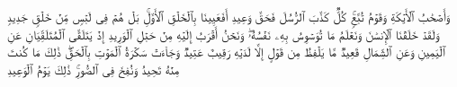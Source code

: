 \stopbuffer%
\startbuffer[\q:50:14]
وَأَصۡحَٰبُ ٱلۡأَیۡكَةِ وَقَوۡمُ تُبَّعࣲۚ كُلࣱّ كَذَّبَ ٱلرُّسُلَ فَحَقَّ وَعِیدِ%
\stopbuffer%
\startbuffer[\q:50:15]
أَفَعَیِینَا بِٱلۡخَلۡقِ ٱلۡأَوَّلِۚ بَلۡ هُمۡ فِی لَبۡسࣲ مِّنۡ خَلۡقࣲ جَدِیدࣲ%
\stopbuffer%
\startbuffer[\q:50:16]
وَلَقَدۡ خَلَقۡنَا ٱلۡإِنسَٰنَ وَنَعۡلَمُ مَا تُوَسۡوِسُ بِهِۦ نَفۡسُهُۥۖ وَنَحۡنُ أَقۡرَبُ إِلَیۡهِ مِنۡ حَبۡلِ ٱلۡوَرِیدِ%
\stopbuffer%
\startbuffer[\q:50:17]
إِذۡ یَتَلَقَّى ٱلۡمُتَلَقِّیَانِ عَنِ ٱلۡیَمِینِ وَعَنِ ٱلشِّمَالِ قَعِیدࣱ%
\stopbuffer%
\startbuffer[\q:50:18]
مَّا یَلۡفِظُ مِن قَوۡلٍ إِلَّا لَدَیۡهِ رَقِیبٌ عَتِیدࣱ%
\stopbuffer%
\startbuffer[\q:50:19]
وَجَاۤءَتۡ سَكۡرَةُ ٱلۡمَوۡتِ بِٱلۡحَقِّۖ ذَٰلِكَ مَا كُنتَ مِنۡهُ تَحِیدُ%
\stopbuffer%
\startbuffer[\q:50:20]
وَنُفِخَ فِی ٱلصُّورِۚ ذَٰلِكَ یَوۡمُ ٱلۡوَعِیدِ%
\stopbuffer%
